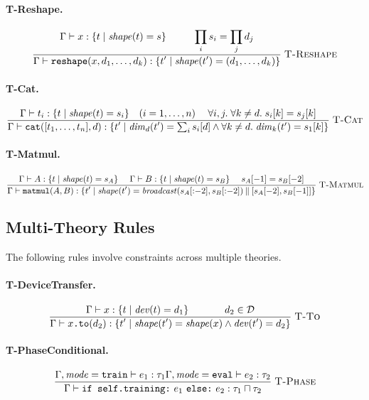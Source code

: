 \documentclass[10pt]{article}
\newcommand{\typerule}[3]{%
  \frac{\displaystyle #2}{\displaystyle #3}
  \;\textsc{#1}%
}
\theoremstyle{plain}
\theoremstyle{definition}
\theoremstyle{remark}
\begin{document}
\paragraph{T-Reshape.}
\[
\typerule{T-Reshape}{\Gamma \vdash x : \{t \mid \mathit{shape}(t) = s\} \\
   \prod_{i} s_i = \prod_{j} d_j}{\Gamma \vdash \texttt{reshape}(x, d_1, \ldots, d_k) :
    \{t' \mid \mathit{shape}(t') = (d_1, \ldots, d_k)\}}
\]

\paragraph{T-Cat.}
\[
\typerule{T-Cat}{\Gamma \vdash t_i : \{t \mid \mathit{shape}(t) = s_i\}
    \quad (i = 1, \ldots, n) \\
   \forall i,j.\; \forall k \neq d.\; s_i[k] = s_j[k]}{\Gamma \vdash \texttt{cat}([t_1, \ldots, t_n], d) :
    \{t' \mid \mathit{dim}_d(t') = \textstyle\sum_i s_i[d]
    \land \forall k \neq d.\; \mathit{dim}_k(t') = s_1[k]\}}
\]

\paragraph{T-Matmul.}
\[
\typerule{T-Matmul}{\Gamma \vdash A : \{t \mid \mathit{shape}(t) = s_A\} \\
   \Gamma \vdash B : \{t \mid \mathit{shape}(t) = s_B\} \\
   s_A[-1] = s_B[-2]}{\Gamma \vdash \texttt{matmul}(A, B) :
    \{t' \mid \mathit{shape}(t') =
      \mathit{broadcast}(s_A[{:}{-}2], s_B[{:}{-}2])
      \mathbin\| [s_A[-2], s_B[-1]]\}}
\]

\subsection{Multi-Theory Rules}

The following rules involve constraints across multiple theories.

\paragraph{T-DeviceTransfer.}
\[
\typerule{T-To}{\Gamma \vdash x : \{t \mid \mathit{dev}(t) = d_1\} \\
   d_2 \in \mathcal{D}}{\Gamma \vdash x\texttt{.to}(d_2) :
    \{t' \mid \mathit{shape}(t') = \mathit{shape}(x) \land
      \mathit{dev}(t') = d_2\}}
\]

\paragraph{T-PhaseConditional.}
\[
\typerule{T-Phase}{\Gamma, \mathit{mode} = \texttt{train} \vdash e_1 : \tau_1 \\
   \Gamma, \mathit{mode} = \texttt{eval} \vdash e_2 : \tau_2}{\Gamma \vdash \texttt{if self.training:}~e_1~\texttt{else:}~e_2 :
    \tau_1 \sqcap \tau_2}
\]
\end{document}
